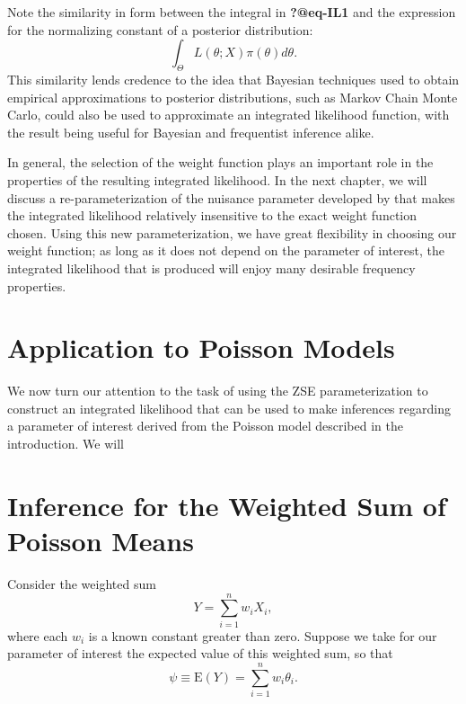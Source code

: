 \documentclass[
  12pt]{article}
\begin{document}
Note the similarity in form between the integral in \textbf{?@eq-IL1}
and the expression for the normalizing constant of a posterior
distribution: \[\int_{\Theta} L(\theta; X)\pi(\theta) d\theta.\] This
similarity lends credence to the idea that Bayesian techniques used to
obtain empirical approximations to posterior distributions, such as
Markov Chain Monte Carlo, could also be used to approximate an
integrated likelihood function, with the result being useful for
Bayesian and frequentist inference alike.

In general, the selection of the weight function plays an important role
in the properties of the resulting integrated likelihood. In the next
chapter, we will discuss a re-parameterization of the nuisance parameter
developed by \citet{severini2007} that makes the integrated likelihood
relatively insensitive to the exact weight function chosen. Using this
new parameterization, we have great flexibility in choosing our weight
function; as long as it does not depend on the parameter of interest,
the integrated likelihood that is produced will enjoy many desirable
frequency properties.

\section{Application to Poisson
Models}\label{application-to-poisson-models}

We now turn our attention to the task of using the ZSE parameterization
to construct an integrated likelihood that can be used to make
inferences regarding a parameter of interest derived from the Poisson
model described in the introduction. We will

\section{Inference for the Weighted Sum of Poisson
Means}\label{inference-for-the-weighted-sum-of-poisson-means}

Consider the weighted sum \[Y = \sum_{i=1}^n w_iX_i,\] where each
\(w_i\) is a known constant greater than zero. Suppose we take for our
parameter of interest the expected value of this weighted sum, so that
\[\psi \equiv \text{E}(Y) = \sum_{i=1}^n w_i\theta_i.\]


\renewcommand\refname{Examples}
  
\end{document}
